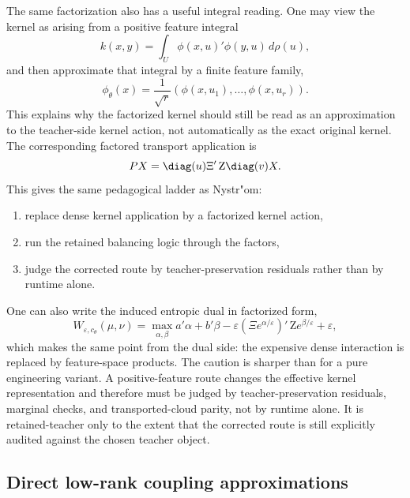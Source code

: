 The same factorization also has a useful integral reading.  One may view the kernel
as arising from a positive feature integral
\begin{equation}
\label{eq:bf-learned-ot-positive-integral}
  k(x,y)
  =
  \int_U \phi(x,u)'\phi(y,u)\,d\rho(u),
\end{equation}
and then approximate that integral by a finite feature family,
\begin{equation}
\label{eq:bf-learned-ot-positive-finite}
  \phi_\theta(x)
  =
  \frac{1}{\sqrt r}
  (\phi(x,u_1),\ldots,\phi(x,u_r)).
\end{equation}
This explains why the factorized kernel should still be read as an approximation to
the teacher-side kernel action, not automatically as the exact original kernel.
The corresponding factored transport
application is
\begin{equation}
\label{eq:bf-learned-ot-positive-transport}
  PX
  =
  \diag(u)\Xi'\,\mathrm Z\diag(v)X.
\end{equation}
This gives the same pedagogical ladder as Nystr"om:
\begin{enumerate}[label=(\roman*)]
  \item replace dense kernel application by a factorized kernel action,
  \item run the retained balancing logic through the factors,
  \item judge the corrected route by teacher-preservation residuals rather than by
    runtime alone.
\end{enumerate}
One can also write the induced entropic dual in factorized form,
\begin{equation}
\label{eq:bf-learned-ot-positive-dual}
  W_{\varepsilon,c_\theta}(\mu,\nu)
  =
  \max_{\alpha,\beta}
  a'\alpha+b'\beta
  - \varepsilon(\Xi e^{\alpha/\varepsilon})'\,\mathrm Z e^{\beta/\varepsilon}
  + \varepsilon,
\end{equation}
which makes the same point from the dual side: the expensive dense interaction is
replaced by feature-space products.  The caution is sharper than for a pure
engineering variant.  A positive-feature route changes the effective kernel
representation and therefore must be judged by teacher-preservation residuals,
marginal checks, and transported-cloud parity, not by runtime alone.  It is
retained-teacher only to the extent that the corrected route is still explicitly
audited against the chosen teacher object.

\subsection{Direct low-rank coupling approximations}
\label{sec:bf-learned-ot-low-rank}

